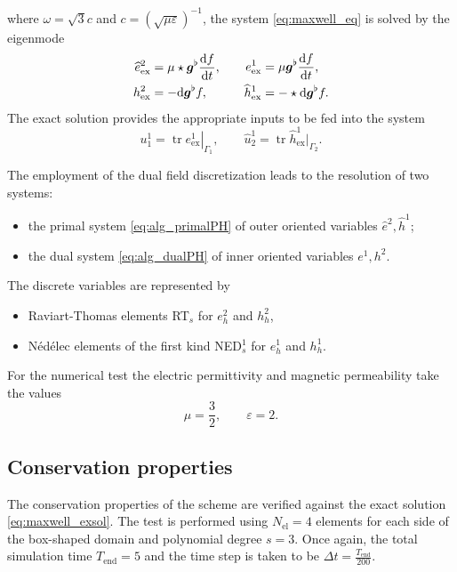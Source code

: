 \documentclass{elsarticle}
\newcommand{\revTwo}[1]{{\color{black}#1}}
\renewcommand\d{\ensuremath{\mathrm{d}}}
\DeclareMathOperator{\tr}{tr}
\newcommand*{\dual}[1]{\ensuremath{\widehat{#1}}}
\begin{document}
where $\omega = \sqrt{3} c$ and $c=(\sqrt{\mu \varepsilon})^{-1}$, the system \eqref{eq:maxwell_eq} is solved by the eigenmode 
\begin{equation}\label{eq:maxwell_exsol}
\begin{aligned}
\dual{e}^2_{\mathrm{ex}} &= \mu \star \bm{g}^\flat \diff{f}{t}, \\    
h^2_{\mathrm{ex}} &= -\d{\bm{g}^\flat} f, 
\end{aligned} \qquad
\begin{aligned}
e^1_{\mathrm{ex}} &= \mu \bm{g}^\flat \diff{f}{t}, \\    
\dual{h}^1_{\mathrm{ex}} &= -\star \d{\bm{g}^\flat} f.
\end{aligned}
\end{equation}
The exact solution provides the appropriate inputs to be fed into the system
\begin{equation}
    u^1_1 = \left. \tr e^1_{\mathrm{ex}}  \right\vert_{\Gamma_1}, \qquad \dual{u}^1_2 = \tr \dual{h}^1_{\mathrm{ex}} \vert_{\Gamma_2}.
\end{equation}

\revTwo{
The employment of the dual field discretization leads to the resolution of two systems:
\begin{itemize}
    \item the primal system \eqref{eq:alg_primalPH} of outer oriented variables $\dual{e}^2, \dual{h}^1$;
    \item the dual system \eqref{eq:alg_dualPH} of inner oriented variables ${e}^1, h^2$.
\end{itemize}
The discrete variables are represented by
\begin{itemize}
    \item Raviart-Thomas elements RT$_s$ for $e^2_h$ and $h^2_h$,
    \item Nédélec elements of the first kind NED$_s^1$ for $e^1_h$ and $h^1_h$.
\end{itemize}
}
For the numerical test the electric permittivity and magnetic permeability take the values
\begin{equation*}
    \mu = \frac{3}{2}, \qquad \varepsilon = 2.
\end{equation*}

\subsection{Conservation properties}

The conservation properties of the scheme are verified against the exact solution \eqref{eq:maxwell_exsol}. The test is performed using $N_{\text{el}}=4$ elements for each side of the box-shaped domain and polynomial degree $s=3$. Once again, the total simulation time $T_{\text{end}}=5$ and the time step is taken to be $\Delta t= \frac{T_{\text{end}}}{200}$. \\
\end{document}
